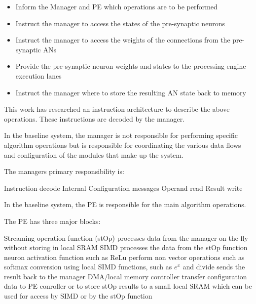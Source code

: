\documentclass[journal]{IEEEtran}
\begin{document}
\begin{itemize}
    \item Inform the Manager and PE which operations are to be performed
    \item Instruct the manager to access the states of the pre-synaptic neurons
    \item Instruct the manager to access the weights of the connections from the pre-synaptic ANs
    \item Provide the pre-synaptic neuron weights and states to the processing engine execution lanes
    \item Instruct the manager where to store the resulting AN state back to memory
\end{itemize}

This work has researched an instruction architecture to describe the above operations. 
These instructions are decoded by the manager. 

In the baseline system, the manager is not responsible for performing specific algorithm operations but is responsible for coordinating the various data flows and configuration of the modules that make up the system.

The managers primary responsibility is:

\begin{outline}
    \1 Instruction decode
    \1 Internal Configuration messages
    \1 Operand read
    \1 Result write
\end{outline}

In the baseline system, the PE is responsible for the main algorithm operations.

The PE has three major blocks:

\begin{outline}
    \1 Streaming operation function (stOp)
      \2 processes data from the manager on-the-fly without storing in local SRAM
    \1 SIMD
      \2 processes the data from the stOp function
        \3 neuron activation function such as ReLu
        \3 perform non vector operations such as softmax conversion using local SIMD functions, such as $e^x$ and divide
      \2 sends the result back to the manager
    \1 DMA/local memory controller
      \2 transfer configuration data to PE conroller or to store stOp results to a small local SRAM which can be used for access by SIMD or by the stOp function
\end{outline}
\end{document}
